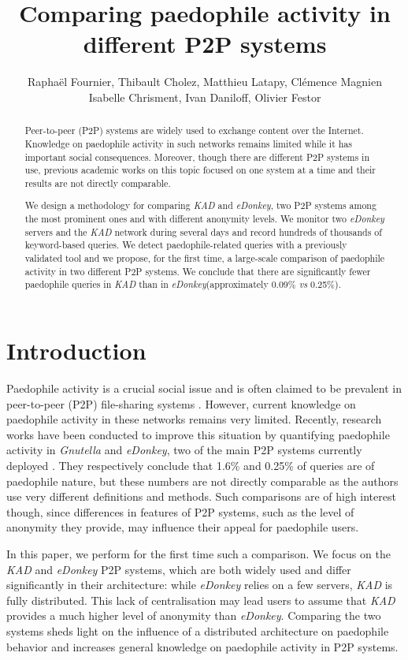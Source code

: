\documentclass[a4paper,oneside,12pt]{article}
\title{Comparing paedophile activity in different P2P systems}
\author{Rapha\"el Fournier, Thibault Cholez, Matthieu Latapy, Cl\'emence Magnien\\ 
Isabelle Chrisment, Ivan Daniloff, Olivier Festor}
\newcommand{\edonkey}{{\em eDonkey}\xspace}
\newcommand{\vs}{{\em vs}\xspace}
\newcommand{\kad}{{\em KAD}\xspace}
\newcommand{\gnutella}{{\em Gnutella}\xspace}
\begin{document}
\maketitle
\thispagestyle{empty}



\begin{abstract}
  Peer-to-peer (P2P) systems are widely used to exchange content over the
Internet. Knowledge on paedophile activity in such networks remains limited
while it has important social consequences. Moreover, though there are different
P2P systems in use, previous academic works on this topic focused on one system
at a time and their results are not directly comparable.

We design a methodology for comparing \kad and \edonkey, two P2P systems
among the most prominent ones and with different anonymity levels. We monitor
two \edonkey servers and the \kad network during several days and record
hundreds of thousands of keyword-based queries. We detect paedophile-related
queries with a previously validated tool and we propose, for the first time, a
large-scale comparison of paedophile activity in two different P2P systems. We
conclude that there are significantly fewer paedophile queries in \kad than in
\edonkey (approximately 0.09\% \vs 0.25\%).
 \end{abstract}

\section{Introduction}
\label{sec-introduction}

Paedophile activity is a crucial social issue and is often claimed to be prevalent in peer-to-peer (P2P) file-sharing systems \cite{saferInternet,cnet03riaa}. However, current knowledge on paedophile activity in these networks remains very limited. Recently, research works have been conducted to improve this situation by quantifying paedophile activity in \gnutella and \edonkey, two of the main P2P systems currently deployed \cite{hughes06is,QuantifyingIPM}. They respectively conclude that 1.6\% and 0.25\% of queries are of paedophile nature, but these numbers are not directly comparable as the authors use very different definitions and methods. Such comparisons are of high interest though, since differences in features of P2P systems, such as the level of anonymity they provide, may influence their appeal for paedophile users. 

In this paper, we perform for the first time such a comparison. We focus on the \kad and \edonkey P2P systems, which are both widely used and differ significantly in their architecture: while \edonkey relies on a few servers, \kad is fully distributed. This lack of centralisation may lead users to assume that \kad provides a much higher level of anonymity than \edonkey. Comparing the two systems sheds light on the influence of a distributed architecture on paedophile behavior and increases general knowledge on paedophile activity in P2P systems. 
\end{document}
